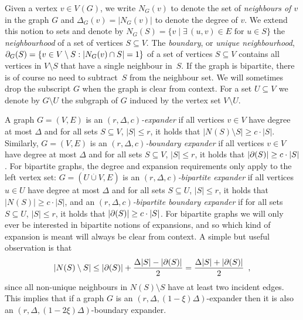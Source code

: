 \documentclass{theoretics}
\newcommand{\boundary}[1]{\ensuremath{\partial #1}}
\newcommand{\set}[1]{\{ #1 \}}
\newcommand{\setdescr}[3][\mid]{\set{ #2 #1 #3 }}
\newcommand{\setsize}[1]{\lvert#1\rvert}
\newcommand{\intersection}{\cap}
\newcommand{\disjointunion}{\overset{.}{\cup}}
\newcommand{\introduceterm}[1]{{\emph{#1}}}
\newcommand{\eqcomma}{\enspace ,}
\newcommand{\neigh}[2][]{N_{{#1}}(#2)}
\newcommand{\uniqueNeigh}[2][]{\boundary_{{#1}} ({#2})}
\renewcommand{\deg}[2][XXXXXXXXXXXX]{\Delta_{#1}(#2)}
\newcommand{\diff}{\xi}
\newcommand{\GdegMax}{\Delta}
\newcommand{\gdegmax}{\GdegMax}
\newcommand{\V}[1][]{V_{#1}}
\numberwithin{equation}{section}
\begin{document}
Given a vertex $v \in \V(G)$,
we write 
$\neigh[G]{v}$
to denote the set of \emph{neighbours of $v$} in the graph $G$
and $\deg[G]{v} = \setsize{\neigh[G]{v}}$ to denote the degree of $v$.
We extend this notion to sets and denote by 
$\neigh[G]{S} = \setdescr{v}{\exists\, (u,v)\in E \text { for } u\in S}$ 
the \emph{neighbourhood}
of a set of vertices $S \subseteq V$.
The \emph{boundary}, 
or \emph{unique  neighbourhood},
$\uniqueNeigh[G]{S}
=
\setdescr[:]
{v \in V \setminus S}
{\setsize{\neigh[G]{v} \intersection S} = 1}
$
of a set of vertices
$S \subseteq V$ 
contains all vertices in
$V \setminus  S$ that have a single neighbour 
in~$S$.
  If the graph is bipartite, there is of course  no need to
  subtract~$S$ from the neighbour set.
We will sometimes drop the subscript $G$ when the graph is clear from
context.
For a set $U \subseteq \V$ we
denote by $G\setminus U$ the subgraph of $G$ induced by the vertex set
$\V \setminus U$.  

A graph $G = (V, E)$ is an
\introduceterm{$(r, \gdegmax, c)$-expander} 
if all vertices $v \in V$ have degree at most $\gdegmax$ and for all
sets $S \subseteq V$, $\setsize{S} \le r$, it holds that
$\setsize{ \neigh{S} \setminus S } \geq c \cdot \setsize{S}$.
Similarly,
$G = (V, E)$
is an \emph{$(r, \gdegmax, c)$-boundary expander} if all vertices 
$v \in V$ 
have degree at most $\gdegmax$ and for all sets  
$S \subseteq V$,  $\setsize{S} \leq r$,
it holds that $\setsize{ \uniqueNeigh{S} } \geq c \cdot \setsize{S}$. 
For bipartite graphs, 
the degree and expansion requirements only apply to the left vertex set:
$G = (U \disjointunion V, E)$
is an
\introduceterm{$(r, \gdegmax, c)$-bipartite expander} 
if all vertices 
$u \in U$ 
have degree at most $\gdegmax$ and for all sets  
$S \subseteq U$,  $\setsize{S} \leq r$,
it holds that $\setsize{ \neigh{S} } \geq c \cdot \setsize{S}$,
and an
\emph{$(r, \gdegmax, c)$-bipartite boundary expander} if 
for all sets  
$S \subseteq U$,  $\setsize{S} \leq r$,
it holds that $\setsize{ \uniqueNeigh{S} } \geq c \cdot \setsize{S}$. 
For bipartite graphs we will only ever be interested in bipartite
notions of expansions, and so which kind of expansion is meant will
always be clear from context.
A simple
but useful observation is that
\begin{equation}
  \label{eq:neighbour-leq-unique}
  \setsize{ N(S) \setminus S } \le 
  \setsize{ \uniqueNeigh{S}}  + 
  \frac{\GdegMax \setsize{ S } - \setsize{ \uniqueNeigh{S} }}{2}
  = \frac{\GdegMax \setsize{ S } + \setsize{ \uniqueNeigh{S} }}{2}
  \eqcomma
\end{equation}
since all non-unique neighbours in $N(S) \setminus S$ have at least two incident edges.
This implies that if a graph $G$ is an 
\mbox{$(r, \gdegmax, (1-\diff)\gdegmax)$}-expander then it 
is
also
an $(r, \gdegmax, (1-2\diff)\gdegmax)$-boundary expander.
\end{document}
